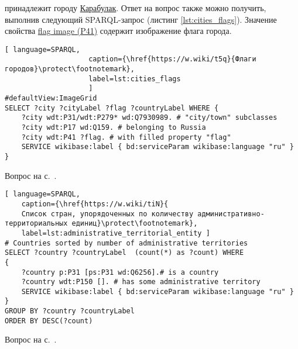 \begin{task}
    \label{answer:cities_flags}
     принадлежит городу \href{https://w.wiki/oLF}{Карабулак}. Ответ на вопрос также можно получить, выполнив следующий SPARQL-запрос (листинг \ref{lst:cities_flags}). Значение свойства \href{https://www.wikidata.org/wiki/Property:P41}{flag image (P41)} содержит изображение флага города.
    
    \begin{lstlisting}[ language=SPARQL, 
                    caption={\href{https://w.wiki/t5q}{Флаги городов}\protect\footnotemark},
                    label=lst:cities_flags
                    ]
#defaultView:ImageGrid
SELECT ?city ?cityLabel ?flag ?countryLabel WHERE {
	?city wdt:P31/wdt:P279* wd:Q7930989. # "city/town" subclasses
	?city wdt:P17 wd:Q159. # belonging to Russia	
	?city wdt:P41 ?flag. # with filled property "flag"
	SERVICE wikibase:label { bd:serviceParam wikibase:language "ru" }
}
\end{lstlisting}
    
    \small{Вопрос на с.~\pageref{lst:countries_sister_cities_with_Russia}.}
\end{task}




\newpage
\begin{task}
	\label{answer:administrative_territorial}
	
\begin{lstlisting}[ language=SPARQL, 
	caption={\href{https://w.wiki/tiN}{
	Список стран, упорядоченных по количеству административно-территориальных единиц}\protect\footnotemark},
	label=lst:administrative_territorial_entity	]
# Countries sorted by number of administrative territories
SELECT ?country ?countryLabel  (count(*) as ?count) WHERE
{
    ?country p:P31 [ps:P31 wd:Q6256].# is a country
    ?country wdt:P150 []. # has some administrative territory
    SERVICE wikibase:label { bd:serviceParam wikibase:language "ru" }
}
GROUP BY ?country ?countryLabel
ORDER BY DESC(?count)
\end{lstlisting}
	
\small{Вопрос на с.~\pageref{lst:age_of_country}.}
\end{task}




